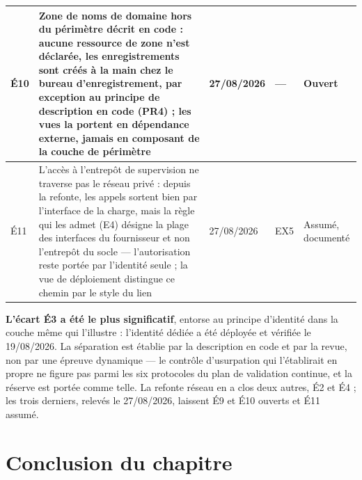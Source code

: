 \begin{table}[htbp]
\begin{tabular}{|P{0.75cm}|P{7.70cm}|P{1.95cm}|P{1.85cm}|P{2.34cm}|}
É10 & Zone de noms de domaine hors du périmètre décrit en code : aucune ressource de zone n'est
déclarée, les enregistrements sont créés à la main chez le bureau d'enregistrement, par exception
au principe de description en code (PR4) ; les vues la portent en dépendance externe, jamais en
composant de la couche de périmètre & 27/08/2026 & --- & Ouvert
\\ \hline
É11 & L'accès à l'entrepôt de supervision ne traverse pas le réseau privé : depuis la refonte, les
appels sortent bien par l'interface de la charge, mais la règle qui les admet (E4) désigne la plage
des interfaces du fournisseur et non l'entrepôt du socle --- l'autorisation reste portée par
l'identité seule ; la vue de déploiement distingue ce chemin par le style du lien & 27/08/2026 &
EX5 & Assumé, documenté \\
\hline
\end{tabular}
\end{table}

\textbf{L'écart É3 a été le plus significatif}, entorse au principe d'identité dans la couche même
qui l'illustre : l'identité dédiée a été déployée et vérifiée le 19/08/2026. La séparation est
établie par la description en code et par la revue, non par une épreuve dynamique --- le contrôle
d'usurpation qui l'établirait en propre ne figure pas parmi les six protocoles du plan de validation
continue, et la réserve est portée comme telle. La refonte réseau en a clos deux autres, É2 et É4 ;
les trois derniers, relevés le 27/08/2026, laissent É9 et É10 ouverts et É11 assumé.

\section*{Conclusion du chapitre}


